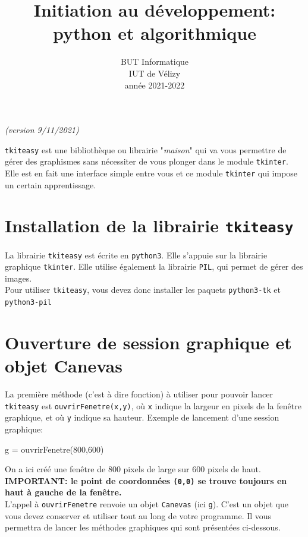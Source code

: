 \documentclass[11pt,a4paper]{article}
\title{Initiation au développement: python et algorithmique}
\author{BUT Informatique\\
IUT de Vélizy\\
année 2021-2022}
\date{}
\begin{document}





\thispagestyle{empty}


\newpage 
\hfill {\it (version 9/11/2021)}
\begin{center}
\end{center}

{\tt tkiteasy} est une bibliothèque ou librairie "{\it maison}" qui va vous permettre de gérer des graphismes sans nécessiter de vous plonger dans le module {\tt tkinter}. Elle est en fait une interface simple entre vous et ce module {\tt tkinter} qui impose un certain apprentissage.

\section{Installation de la librairie {\tt tkiteasy}}
La librairie {\tt tkiteasy} est écrite en {\tt python3}. Elle s'appuie sur la librairie graphique {\tt tkinter}. Elle utilise également la librairie {\tt PIL}, qui permet de gérer des images.\\ 
Pour utiliser {\tt tkiteasy}, vous devez donc installer les paquets {\tt python3-tk} et {\tt python3-pil}

\section{Ouverture de session graphique et objet Canevas}
La première méthode (c'est à dire fonction) à utiliser pour pouvoir lancer {\tt tkiteasy} est {\tt ouvrirFenetre(x,y)}, où {\tt x} indique la largeur en pixels de la fenêtre graphique, et où {\tt y} indique sa hauteur. Exemple de lancement d'une session graphique:
\begin{ccode}
    g = ouvrirFenetre(800,600)
\end{ccode}
On a ici créé une fenêtre de 800 pixels de large sur 600 pixels de haut.\\
{\bf IMPORTANT: le point de coordonnées {\tt (0,0)} se trouve toujours en haut à gauche de la fenêtre.}\\

L'appel à {\tt ouvrirFenetre} renvoie un objet {\tt Canevas} (ici {\tt g}). C'est un objet que vous devez conserver et utiliser tout au long de votre programme. Il vous permettra de lancer les méthodes graphiques qui sont présentées ci-dessous.
\end{document}

